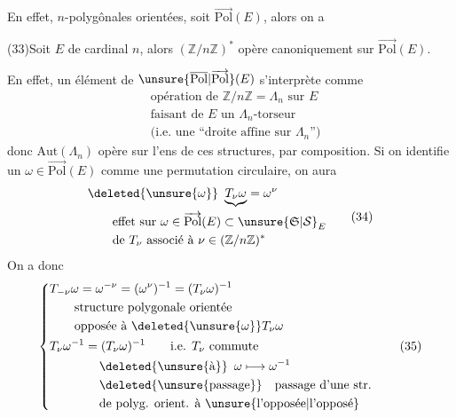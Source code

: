 
En effet,   $n$-polygônales orientées, soit $\overrightarrow{\mathrm{Pol}}(E)$, alors on a

(33)\qquad Soit $E$ de cardinal $n$, alors $(\mathbb Z/n\mathbb Z)^*$ opère canoniquement sur $\overrightarrow{\mathrm{Pol}}(E)$.

En effet, un élément de $\unsure{\overline{\mathrm{Pol}}|\overrightarrow{\mathrm{Pol}}}(E)$ s'interprète comme
\[
\begin{aligned}
&\text{opération de }\mathbb Z/n\mathbb Z=\Lambda_n\text{ sur }E\\
&\text{faisant de }E\text{ un }\Lambda_n\text{-torseur}\\
&\text{(i.e. une ``droite affine sur }\Lambda_n\text{'')}
\end{aligned}
\]
donc $\mathrm{Aut}(\Lambda_n)$ opère sur l'ens de ces structures, par composition. Si on identifie un $\omega\in\overrightarrow{\mathrm{Pol}}(E)$ comme une permutation circulaire, on aura
\[
\begin{aligned}
&\deleted{\unsure{\omega}}\ \underbrace{T_{\nu}\omega}=\omega^\nu\\
&\qquad\text{effet sur }\omega\in\overrightarrow{\mathrm{Pol}}(E)\subset\unsure{\mathfrak S|\mathcal S}_E\\
&\qquad\text{de }T_\nu\text{ associé à }\nu\in(\mathbb Z/n\mathbb Z)^*
\end{aligned}\tag*{(34)}
\]
On a donc
\[
\left\{\begin{aligned}
&T_{-\nu}\omega=\omega^{-\nu}=(\omega^\nu)^{-1}=(T_\nu\omega)^{-1}\\
&\qquad\text{structure polygonale orientée}\\
&\qquad\text{opposée à }\deleted{\unsure{\omega}}T_\nu\omega\\
&T_\nu\omega^{-1}=(T_\nu\omega)^{-1}\qquad\text{i.e. }T_\nu\text{ commute}\\
&\qquad\qquad\deleted{\unsure{\text{à}}}\enspace\omega\longmapsto\omega^{-1}\\
&\qquad\qquad\deleted{\text{\unsure{passage}}}\quad\text{passage d'une str.}\\
&\qquad\qquad\text{de polyg. orient. à \unsure{l'opposée|l'opposé}}
\end{aligned}\right.\tag*{(35)}
\]

